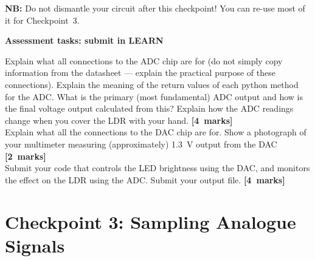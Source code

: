{\bf NB:} Do not dismantle your circuit after this checkpoint!
You can re-use most of it for Checkpoint~3.

{\bf Assessment tasks: submit in LEARN}

Explain what all connections to the ADC chip are for (do not simply copy information from the datasheet --- explain the practical purpose of these connections).
Explain the meaning of the return values of each python method for the ADC.
What is the primary (most fundamental) ADC output and how is the final voltage output calculated from this?
Explain how the ADC readings change when you cover the LDR with your hand.
\hfill {\bf[4~marks]} \\

Explain what all the connections to the DAC chip are for.
Show a photograph of your multimeter measuring (approximately) 1.3~V output from the DAC
\hfill {\bf[2~marks]} \\

Submit your code that controls the LED brightness using the DAC, and monitors the effect on the LDR using the ADC.
Submit your output file.
\hfill {\bf[4~marks]} \\



\newpage
\section{Checkpoint 3: Sampling Analogue Signals}

